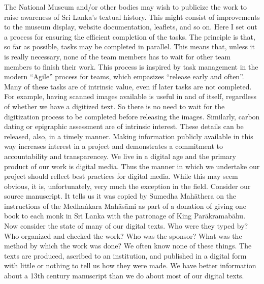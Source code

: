 \markdownRendererOlEnd \markdownRendererInterblockSeparator
{}\markdownRendererInterblockSeparator
{}The National Museum and/or other bodies may wish to publicize the work to raise awareness of Sri Lanka’s textual history. This might consist of improvements to the museum display, website documentation, leaflets, and so on.\markdownRendererInterblockSeparator
{}\markdownRendererInterblockSeparator
{}Here I set out a process for ensuring the efficient completion of the tasks. The principle is that, so far as possible, tasks may be completed in parallel. This means that, unless it is really necessary, none of the team members has to wait for other team members to finish their work. This process is inspired by task management in the modern “Agile” process for teams, which empasizes “release early and often”.\markdownRendererInterblockSeparator
{}Many of these tasks are of intrinsic value, even if later tasks are not completed. For example, having scanned images available is useful in and of itself, regardless of whether we have a digitized text. So there is no need to wait for the digitization process to be completed before releasing the images. Similarly, carbon dating or epigraphic assessment are of intrinsic interest. These details can be released, also, in a timely manner. Making information publicly available in this way increases interest in a project and demonstrates a commitment to accountability and transparencey.\markdownRendererInterblockSeparator
{}\markdownRendererInterblockSeparator
{}\markdownRendererInterblockSeparator
{}We live in a digital age and the primary product of our work is digital media. Thus the manner in which we undertake our project should reflect best practices for digital media. While this may seem obvious, it is, unfortunately, very much the exception in the field.\markdownRendererInterblockSeparator
{}Consider our source manuscript. It tells us it was copied by Sumedha Mahāthera on the instructions of the Medhaṅkara Mahāsāmi as part of a donation of giving one book to each monk in Sri Lanka with the patronage of King Parākramabāhu.\markdownRendererInterblockSeparator
{}Now consider the state of many of our digital texts. Who were they typed by? Who organized and checked the work? Who was the sponsor? What was the method by which the work was done? We often know none of these things. The texts are produced, ascribed to an institution, and published in a digital form with little or nothing to tell us how they were made. We have better information about a 13th century manuscript than we do about most of our digital texts.\markdownRendererInterblockSeparator
